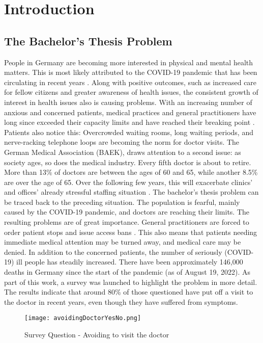
\chapter{Introduction}

\section{The Bachelor's Thesis Problem}
People in Germany are becoming more interested in physical and mental health matters. This is most likely attributed to the COVID-19 pandemic that has been circulating in recent years \cite{.bahn-bonn}. Along with positive outcomes, such as increased care for fellow citizens \cite{.bahn-bonn} and greater awareness of health issues, the consistent growth of interest in health issues also is causing problems. With an increasing number of anxious and concerned patients, medical practices and general practitioners have long since exceeded their capacity limits and have reached their breaking point \cite{.sok}. Patients also notice this: Overcrowded waiting rooms, long waiting periods, and nerve-racking telephone loops are becoming the norm for doctor visits. The German Medical Association (BAEK), draws attention to a second issue: as society ages, so does the medical industry. Every fifth doctor is about to retire. More than 13\% of doctors are between the ages of 60 and 65, while another 8.5\% are over the age of 65. Over the following few years, this will exacerbate clinics' and offices' already stressful staffing situation \cite{.blatt}. 
The bachelor's thesis problem can be traced back to the preceding situation. The population is fearful, mainly caused by the COVID-19 pandemic, and doctors are reaching their limits. The resulting problems are of great importance. General practitioners are forced to order patient stops and issue access bans \cite{.sok}. This also means that patients needing immediate medical attention may be turned away, and medical care may be denied. In addition to the concerned patients, the number of seriously (COVID-19) ill people has steadily increased. There have been approximately 146,000 deaths in Germany since the start of the pandemic (as of August 19, 2022). \cite{.rki} As part of this work, a survey was launched to highlight the problem in more detail. The results indicate that around 80\% of those questioned have put off a visit to the doctor in recent years, even though they have suffered from symptoms.
\begin{figure}[H]
	\centering
	\texttt{[image: avoidingDoctorYesNo.png]}
	\caption[Survey Question]{Survey Question - Avoiding to visit the doctor}
\end{figure}
